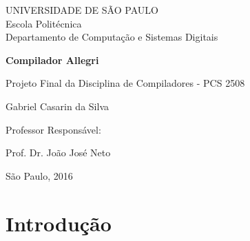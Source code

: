 \documentclass[a4paper,12pt]{report}
\begin{document}
    \begin{titlepage}
        \begin{center}

            UNIVERSIDADE DE SÃO PAULO\\
            Escola Politécnica\\
            Departamento de Computação e Sistemas Digitais
            \vspace{8cm}
            
            \Huge
            \textbf{Compilador Allegri}
            
            \vspace{0.5cm}
            \large
            Projeto Final da Disciplina de Compiladores - PCS 2508
            
            \vspace{2.5cm}
            \Large
            Gabriel Casarin da Silva
            
        \end{center}
        
        \vspace{3.0cm}
        \setlength{\parindent}{8.5cm}
        \large Professor Responsável:

        \setlength{\parindent}{8.5cm}
        Prof. Dr. João José Neto
        

        \begin{center}
            \vfill
            \large
            São Paulo, 2016
        \end{center}
            
    \end{titlepage}
        
    \tableofcontents

    \newpage    
    \chapter{Introdução}
    
\end{document}
